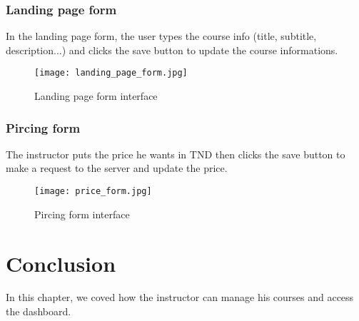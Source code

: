 \subsubsection{Landing page form}
In the landing page form, the user types the course info (title, subtitle, description...) and clicks the save button to update the course informations.

\vfill
\clearpage

\begin{figure}[!ht]
    \centering
    \texttt{[image: landing\_page\_form.jpg]}
    \caption{Landing page form interface}
    \label{fig:landing_page_form}
\end{figure}


\subsubsection{Pircing form}
The instructor puts the price he wants in TND then clicks the save button to make a request to the server and update the price.

\begin{figure}[!ht]
    \centering
    \texttt{[image: price\_form.jpg]}
    \caption{Pircing form interface}
    \label{fig:price_form}
\end{figure}

\vfill
\clearpage

\section*{Conclusion}
In this chapter, we coved how the instructor can manage his courses and access the dashboard.

